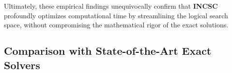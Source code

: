 \documentclass[letterpaper,journal]{IEEEtran}
\begin{document}
Ultimately, these empirical findings unequivocally confirm that \textbf{INCSC} profoundly optimizes computational time by streamlining the logical search space, without compromising the mathematical rigor of the exact solutions.






\subsection{Comparison with State-of-the-Art Exact Solvers}
\end{document}

